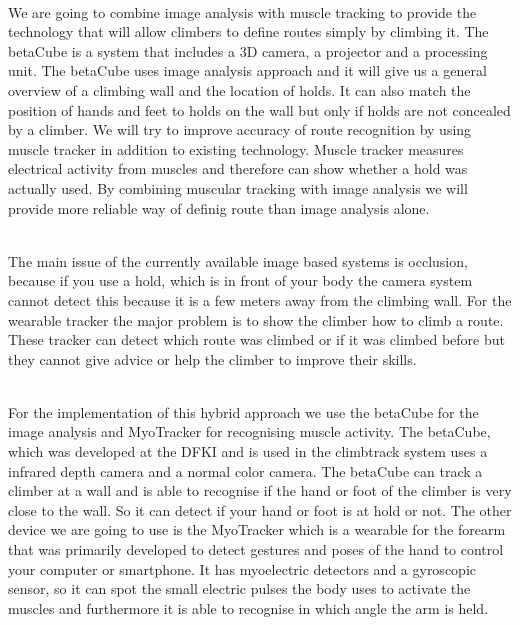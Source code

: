 \\
We are going to combine image analysis with muscle tracking to provide the technology that will allow climbers to define routes simply by climbing it.
The betaCube is a system that includes a 3D camera, a projector and a processing unit.
The betaCube uses image analysis approach and it will give us a general overview of a climbing wall and the location of holds.
It can also match the position of hands and feet to holds on the wall but only if holds are not concealed by a climber.
We will try to improve accuracy of route recognition by using muscle tracker in addition to existing technology.
Muscle tracker measures electrical activity from muscles and therefore can show whether a hold was actually used.
By combining muscular tracking with image analysis we will provide more reliable way of definig route than image analysis alone.

\\
The main issue of the currently available image based systems is occlusion, because if you use a hold, which is in front of your body the camera system cannot detect this because it is a few meters away from the climbing wall.
For the wearable tracker the major  problem is to show the climber how to climb a route.
These tracker can detect which route was climbed or if it was climbed before but they cannot give advice or help the climber to improve their skills.

\\
For the implementation of this hybrid approach we use the betaCube for the image analysis and MyoTracker for recognising muscle activity.
The betaCube, which was developed at the DFKI and is used in the climbtrack system uses a infrared depth camera and a normal color camera. 
The betaCube can track a climber at a wall and is able to recognise if the hand or foot of the climber is very close to the wall.
So it can detect if your hand or foot is at hold or not.
The other device we are going to use is the MyoTracker which is a wearable for the forearm that was primarily developed to detect gestures and poses of the hand to control your computer or smartphone.
It has myoelectric detectors and a gyroscopic sensor, so it can spot the small electric pulses the body uses to activate the muscles and furthermore it is able to recognise in which angle the arm is held.
